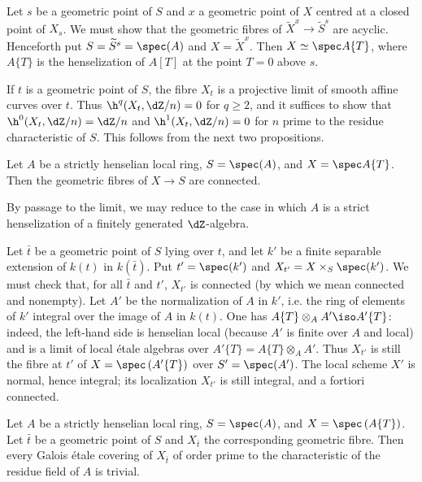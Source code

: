\documentclass[oneside]{book}
\begin{document}
Let $s$ be a geometric point of $S$ and $x$ a geometric point of $X$
centred at a closed point of $X_s$. We must show that the geometric fibres
of $\widetilde X^x\to\widetilde S^s$ are acyclic. Henceforth put
$S=\widetilde S^s=\spec(A)$ and $X=\widetilde X^x$. Then
$X\simeq\spec A\{T\}$, where $A\{T\}$ is the henselization of $A[T]$
at the point $T=0$ above $s$.

If $t$ is a geometric point of $S$, the fibre $X_t$ is a projective
limit of smooth affine curves over $t$. Thus $\h^q(X_t,\dZ/n)=0$ for
$q\geqslant2$, and it suffices to show that
$\h^0(X_t,\dZ/n)=\dZ/n$ and $\h^1(X_t,\dZ/n)=0$ for $n$ prime to the
residue characteristic of $S$. This follows from the next two
propositions.

\begin{proposition}\label{I:5-2-2}
Let $A$ be a strictly henselian local ring, $S=\spec(A)$, and
$X=\spec A\{T\}$. Then the geometric fibres of $X\to S$ are connected.
\end{proposition}

By passage to the limit, we may reduce to the case in which $A$ is a
strict henselization of a finitely generated $\dZ$-algebra.

Let $\bar t$ be a geometric point of $S$ lying over $t$, and let $k'$
be a finite separable extension of $k(t)$ in $k(\bar t)$. Put
$t'=\spec(k')$ and $X_{t'}=X\times_S\spec(k')$. We must check that, for
all $\bar t$ and $t'$, $X_{t'}$ is connected (by which we mean connected
and nonempty). Let $A'$ be the normalization of $A$ in $k'$, i.e. the
ring of elements of $k'$ integral over the image of $A$ in $k(t)$. One
has $A\{T\}\otimes_AA'\iso A'\{T\}$: indeed, the left-hand side is
henselian local (because $A'$ is finite over $A$ and local) and is a
limit of local étale algebras over
$A'\{T\}=A\{T\}\otimes_AA'$. Thus $X_{t'}$ is still the fibre at $t'$
of $X=\spec\left(A'\{T\}\right)$ over $S'=\spec(A')$. The local scheme
$X'$ is normal, hence integral; its localization $X_{t'}$ is still
integral, and a fortiori connected.

\begin{proposition}\label{I:5-2-3}
Let $A$ be a strictly henselian local ring, $S=\spec(A)$, and
$X=\spec\left(A\{T\}\right)$. Let $\bar t$ be a geometric point of $S$
and $X_{\bar t}$ the corresponding geometric fibre. Then every Galois
étale covering of $X_{\bar t}$ of order prime to the characteristic of
the residue field of $A$ is trivial.
\end{proposition}
\end{document}
